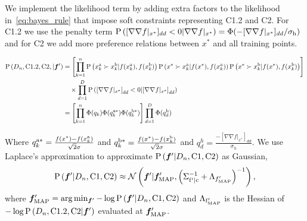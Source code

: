 We implement the likelihood term by adding extra factors to the likelihood
in~\cref{eq:bayes_rule} that impose soft constraints representing C1.2 and C2.
For C1.2 we use the penalty term $\operatorname{P} \left( [\nabla \nabla f|_{x^*}]_{dd} <
0 | \nabla \nabla f|_{x^*} \right) = \Phi(-[\nabla \nabla
f|_{x^*}]_{dd}/\sigma_{\mathrm{h}})$ and for C2 we add more preference relations
between $x^*$ and all training points. 
\begin{fullwidth}
\begin{align}
    \prob{D_n, \tn{C1.2}, \tn{C2}, |\vecf{f}'} 
        &=\left[ \prod_{k=1}^n \prob{x_k^\tn{a} \succ x_k^\tn{b} 
            | f(x_k^\tn{a}), f(x_k^\tn{b})} 
        \prob{x^* \succ x_k^\tn{a} | f(x^*), f(x_k^\tn{a})} 
        \prob{x^* \succ x_k^\tn{b} | f(x^*), f(x_k^\tn{b})} \right] \notag\\
        &\quad \times  \prod_{d=1}^D \prob{{[\nabla \nabla f|_{x^*}]}_{dd} < 0
            | {[\nabla \nabla f|_{x^*}]}_{dd}} \notag \\
        &= \left[ \prod_{k=1}^n \Phi(q_k) \Phi(q_k^{\tn{a}*}) 
                \Phi(q_k^{\tn{b}*}) \right]
            \prod_{d=1}^D \Phi(q_d^\tn{h})
\end{align}
\end{fullwidth}
Where $q_k^{\mathrm{a}*} = \frac{f(x^*) - f(x_k^{\mathrm{a}})}{\sqrt{2} \sigma}$ and
$q_k^{\mathrm{b}*} = \frac{f(x^*) - f(x_k^{\mathrm{b}})}{\sqrt{2} \sigma}$ and $q_d^{h} =
\frac{-[\nabla \nabla f|_{x^*}]_{dd}}{\sigma_h}$. We use Laplace's approximation
to approximate $\prob{\vecf{f}' | D_n, \tn{C1}, \tn{C2}}$ as Gaussian,
\begin{align}
    \prob{\vecf{f}' | D_n, \tn{C1}, \tn{C2}} \approx \mathcal{N}\left(\vecf{f}'|
        \vecf{f}'_{\tn{MAP}}, {\left(\Sigma_\tn{f'|c}^{-1} +
        \Lambda_{f'_\tn{MAP}} \right)}^{-1} \right),
    \label{eq:rprime_given_constraints}
\end{align}
where $\vecf{f}'_\tn{MAP} = \arg \min_{\vecf{f}'} -\log
\prob{\vecf{f}' | D_n, \tn{C1}, \tn{C2}}$ and $\Lambda_{\mathrm{f'_{MAP}}}$ is the
Hessian of $-\log \prob{D_n , \tn{C1.2}, \tn{C2}|\vecf{f}'}$ evaluated at
$\vecf{f}'_\tn{MAP}$.

